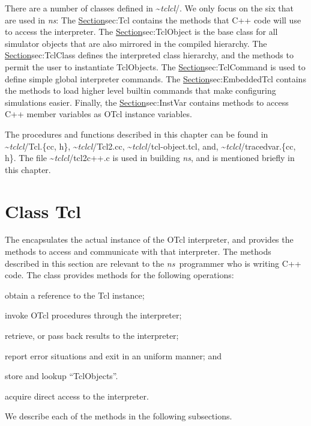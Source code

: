 There are a number of classes defined in \textasciitilde\emph{tclcl}/{}.
We only focus on the six that are used in \emph{ns}:
The \href{Class Tcl}{Section}{sec:Tcl} contains the methods that
C++ code will use to access the interpreter.
The \href{class TclObject}{Section}{sec:TclObject}
is the base class for all simulator objects that are also mirrored 
in the compiled hierarchy.
The \href{class TclClass}{Section}{sec:TclClass} defines
the interpreted class hierarchy, and 
the methods to permit the user to instantiate TclObjects.
The \href{class TclCommand}{Section}{sec:TclCommand}
is used to define simple global interpreter commands.
The \href{class EmbeddedTcl}{Section}{sec:EmbeddedTcl}
contains the methods to load higher level builtin commands
that make configuring simulations easier.
Finally, the \href{class InstVar}{Section}{sec:InstVar}
contains methods to access C++ member variables
as OTcl instance variables.

The procedures and functions described in this chapter can be found in
\textasciitilde\emph{tclcl}/{Tcl.\{cc, h\}}, \textasciitilde\emph{tclcl}/{Tcl2.cc}, \textasciitilde\emph{tclcl}/{tcl-object.tcl}, and,
\textasciitilde\emph{tclcl}/{tracedvar.\{cc, h\}}.
The file \textasciitilde\emph{tclcl}/{tcl2c++.c} is used in building \emph{ns}, and is mentioned
briefly in this chapter.

\section{Class Tcl}
\label{sec:Tcl}

The  encapsulates the actual instance of
the OTcl interpreter, and provides the methods
to access and communicate with that interpreter.
The methods described in this section are relevant to the
\emph{ns}\ programmer who is writing C++ code.
The class provides methods for the following operations:
\begin{list}{\textbullet}{}\itemsep0pt
\item obtain a reference to the Tcl instance;
\item invoke OTcl procedures through the interpreter;
\item retrieve, or pass back results to the interpreter;
\item report error situations and exit in an uniform manner; and
\item store and lookup ``TclObjects''.
\item acquire direct access to the interpreter.
\end{list}
We describe each of the methods in the following subsections.

